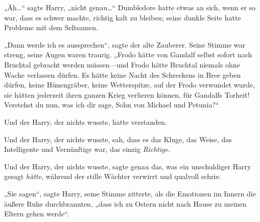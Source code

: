 „Äh…“ sagte Harry, „nicht genau…“ Dumbledore hatte etwas an sich, wenn er so war, dass es schwer machte, richtig kalt zu bleiben; seine dunkle Seite hatte Probleme mit dem Seltsamen.

„Dann werde ich es aussprechen“, sagte der alte Zauberer. Seine Stimme war streng, seine Augen waren traurig. „Frodo hätte von Gandalf selbst sofort nach Bruchtal gebracht werden müssen—und Frodo hätte Bruchtal niemals ohne Wache verlassen dürfen. Es hätte keine Nacht des Schreckens in Bree geben dürfen, keine Hünengräber, keine Wetterspitze, auf der Frodo verwundet wurde, sie hätten jederzeit ihren ganzen Krieg verlieren können, für Gandalfs Torheit! Verstehst du nun, was ich dir sage, Sohn von Michael und Petunia?“

Und der Harry, der nichts wusste, hatte verstanden.

Und der Harry, der nichts wusste, sah, dass es das Kluge, das Weise, das Intelligente und Vernünftige war, das einzig \emph{Richtige}.

Und der Harry, der nichts wusste, sagte genau das, was ein unschuldiger Harry gesagt \emph{hätte}, während der stille Wächter verwirrt und qualvoll schrie.

„Sie sagen“, sagte Harry, seine Stimme zitterte, als die Emotionen im Innern die äußere Ruhe durchbrannten, „dass ich zu Ostern nicht nach Hause zu meinen Eltern gehen werde“.

